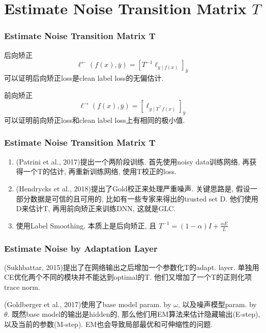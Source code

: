 \documentclass{beamer}
\begin{document}
\section{Estimate Noise Transition Matrix $T$}

\begin{frame}
    \frametitle{Estimate Noise Transition Matrix $\bm T$}
    
    \begin{definition}
        后向矫正
        \begin{equation}
            \ell^{\leftarrow}(f(x), \bar{y})=\left[T^{-1} \ell_{y \mid f(x)}\right]_{\bar{y}}
        \end{equation}
        可以证明后向矫正loss是clean label loss的无偏估计.
    \end{definition}
    

    \begin{definition}
        前向矫正
        \begin{equation}
            \ell^{\rightarrow}(f(x), \bar{y})=\left[\ell_{y \mid T^{\top}f(x)}\right]_{\bar{y}}
        \end{equation}
        可以证明前向矫正loss和clean label loss上有相同的极小值.
    \end{definition}
    
\end{frame}

\begin{frame}
    \frametitle{Estimate Noise Transition Matrix $\bm T$}

    \begin{enumerate}
        \item (Patrini et al., 2017)提出一个两阶段训练. 首先使用noisy data训练网络, 再获得一个T的估计, 再重新训练网络, 使用T校正的loss.
        \item (Hendrycks et al., 2018)提出了Gold校正来处理严重噪声. 关键思路是, 假设一部分数据是可信的且可用的, 比如有一些专家来得出的trusted set D. 他们使用D来估计T, 再用前向矫正来训练DNN, 这就是GLC.
        \item 使用Label Smoothing. 本质上是后向矫正, 且
        $T^{-1}=(1-\alpha) I+\frac{\alpha E}{L}$
    \end{enumerate}

\end{frame}

\begin{frame}
    \frametitle{Estimate Noise by Adaptation Layer}

    (Sukhbattar, 2015)提出了在网络输出之后增加一个参数化T的adapt. layer. 单独用CE优化两个不同的模块并不能达到optimal的T. 他们又增加了一个T的正则化项 trace norm.

    (Goldberger et al., 2017)使用了base model param. by $\omega$, 以及噪声模型param. by $\theta$. 既然base model的输出是hidden的, 那么他们用EM算法来估计隐藏输出(E-step), 以及当前的参数(M-step). EM也会导致局部最优和可伸缩性的问题.

\end{frame}
\end{document}
